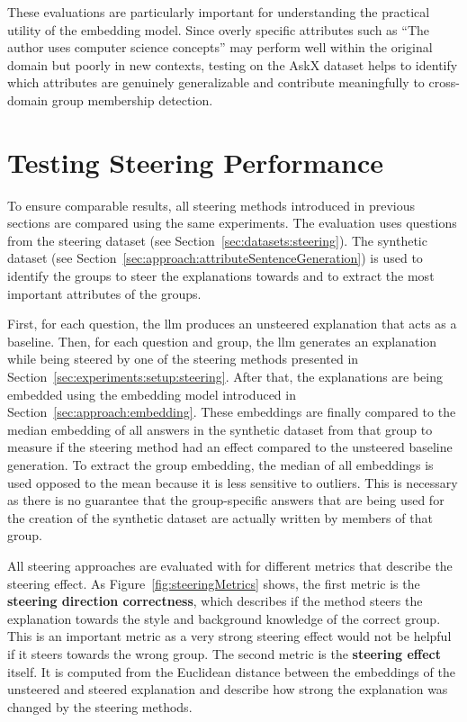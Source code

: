 These evaluations are particularly important for understanding the practical utility of the embedding model. Since overly specific attributes such as \enquote{The author uses computer science concepts} may perform well within the original domain but poorly in new contexts, testing on the AskX dataset helps to identify which attributes are genuinely generalizable and contribute meaningfully to cross-domain group membership detection.


\section{Testing Steering Performance}
\label{sec:experiments:steering}
To ensure comparable results, all steering methods introduced in previous sections are compared using the same experiments. The evaluation uses questions from the steering dataset (see Section~\ref{sec:datasets:steering}). The synthetic dataset (see Section~\ref{sec:approach:attributeSentenceGeneration}) is used to identify the groups to steer the explanations towards and to extract the most important attributes of the groups.

First, for each question, the \ac{llm} produces an unsteered explanation that acts as a baseline.
Then, for each  question and group, the \ac{llm} generates an explanation while being steered by one of the steering methods presented in Section~\ref{sec:experiments:setup:steering}. After that, the explanations are being embedded using the embedding model introduced in Section~\ref{sec:approach:embedding}. These embeddings are finally compared to the median embedding of all answers in the synthetic dataset from that group to measure if the steering method had an effect compared to the unsteered baseline generation.
To extract the group embedding, the median of all embeddings is used opposed to the mean because it is less sensitive to outliers. This is necessary as there is no guarantee that the group-specific answers that are being used for the creation of the synthetic dataset are actually written by members of that group.

All steering approaches are evaluated with for different metrics that describe the steering effect. As Figure~\ref{fig:steeringMetrics} shows, the first metric is the \textbf{steering direction correctness}, which describes if the method steers the explanation towards the style and background knowledge of the correct group. This is an important metric as a very strong steering effect would not be helpful if it steers towards the wrong group. The second metric is the \textbf{steering effect} itself. It is computed from the Euclidean distance between the embeddings of the unsteered and steered explanation and describe how strong the explanation was changed by the steering methods.


